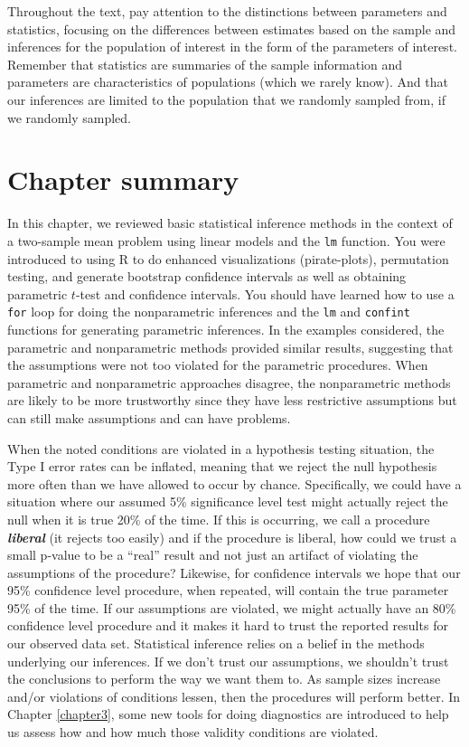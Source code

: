 \documentclass[
]{book}
\begin{document}
\indent Throughout the text, pay attention to the distinctions between parameters
and statistics, focusing on the differences between estimates based on the sample
and inferences for the population of interest in the form of the parameters of
interest. Remember that statistics are summaries of the sample information and
parameters are characteristics of populations (which we rarely know). And that
our inferences are limited to the population that we randomly sampled from, if
we randomly sampled.

\hypertarget{section2-11}{%
\section{Chapter summary}\label{section2-11}}

In this chapter, we reviewed basic statistical inference methods in the context
of a two-sample mean problem using linear models and the \texttt{lm} function. You were introduced to using R to do enhanced visualizations (pirate-plots), permutation
testing, and generate bootstrap confidence intervals as well as obtaining
parametric \(t\)-test and confidence intervals. You should
have learned how to use a \texttt{for} loop for doing the nonparametric inferences
and the \texttt{lm} and \texttt{confint} functions for generating parametric inferences. In the examples considered, the parametric and nonparametric methods provided similar
results, suggesting that the assumptions were not too violated for the parametric procedures. When parametric and nonparametric approaches
disagree, the nonparametric methods are likely to be more trustworthy since
they have less restrictive assumptions but can still make assumptions and can have problems.

\indent When the noted conditions are violated in a hypothesis testing situation, the
Type I error  rates can be inflated, meaning that we reject the null hypothesis
more often than we have allowed to occur by chance. Specifically, we could have
a situation where our assumed 5\% significance level test might actually reject
the null when it is true 20\% of the time. If this is occurring, we call a
procedure \textbf{\emph{liberal}} (it rejects too easily) and if the procedure is liberal,
how could we trust a small p-value to be a ``real'' result and not just an
artifact of violating the assumptions of the procedure? Likewise, for
confidence intervals we hope that our 95\% confidence level procedure, when
repeated, will contain the true parameter 95\% of the time. If our assumptions
are violated, we might actually have an 80\% confidence level procedure and it
makes it hard to trust the reported results for our observed data set.
Statistical inference relies on a belief in the methods underlying our
inferences. If we don't trust our assumptions, we shouldn't trust the
conclusions to perform the way we want them to. As sample sizes increase
and/or violations of conditions lessen, then the procedures will perform better.
In Chapter \ref{chapter3}, some new tools for doing diagnostics are introduced
to help us assess how and how much those validity conditions are violated.
\end{document}
